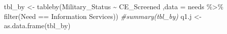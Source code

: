 \documentclass[
]{article}
\newenvironment{Shaded}{\begin{snugshade}}{\end{snugshade}}
\newcommand{\AttributeTok}[1]{\textcolor[rgb]{0.77,0.63,0.00}{#1}}
\newcommand{\CommentTok}[1]{\textcolor[rgb]{0.56,0.35,0.01}{\textit{#1}}}
\newcommand{\FunctionTok}[1]{\textcolor[rgb]{0.00,0.00,0.00}{#1}}
\newcommand{\NormalTok}[1]{#1}
\newcommand{\OtherTok}[1]{\textcolor[rgb]{0.56,0.35,0.01}{#1}}
\newcommand{\SpecialCharTok}[1]{\textcolor[rgb]{0.00,0.00,0.00}{#1}}
\newcommand{\StringTok}[1]{\textcolor[rgb]{0.31,0.60,0.02}{#1}}
\begin{document}
\begin{Shaded}
\begin{Highlighting}[]
\NormalTok{tbl\_by }\OtherTok{\textless{}{-}} \FunctionTok{tableby}\NormalTok{(Military\_Status }\SpecialCharTok{\textasciitilde{}}\NormalTok{ CE\_Screened ,}\AttributeTok{data =}\NormalTok{ needs }\SpecialCharTok{\%\textgreater{}\%} \FunctionTok{filter}\NormalTok{(Need }\SpecialCharTok{==} \StringTok{\textquotesingle{}Information Services\textquotesingle{}}\NormalTok{))}
\CommentTok{\#summary(tbl\_by)}
\NormalTok{q1.j }\OtherTok{\textless{}{-}} \FunctionTok{as.data.frame}\NormalTok{(tbl\_by)}
\end{Highlighting}
\end{Shaded}
\end{document}
